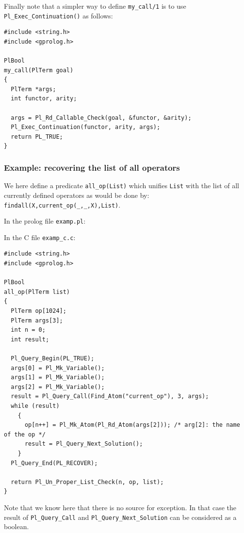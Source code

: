 Finally note that a simpler way to define \texttt{my\_call/1} is to use
\texttt{Pl\_Exec\_Continuation()} as follows:

\begin{Code}
\begin{verbatim}
#include <string.h>
#include <gprolog.h>

PlBool
my_call(PlTerm goal)
{
  PlTerm *args;
  int functor, arity;

  args = Pl_Rd_Callable_Check(goal, &functor, &arity);
  Pl_Exec_Continuation(functor, arity, args);
  return PL_TRUE;
}
\end{verbatim}
\end{Code}

\subsubsection{Example: recovering the list of all operators}

We here define a predicate \texttt{all\_op(List)} which unifies
\texttt{List} with the list of all currently defined operators as would be done by: \texttt{findall(X,current\_op(\_,\_,X),List)}.

In the prolog file \texttt{examp.pl}:


In the C file \texttt{examp\_c.c}:

\begin{Code}
\begin{verbatim}
#include <string.h>
#include <gprolog.h>

PlBool
all_op(PlTerm list)
{
  PlTerm op[1024];
  PlTerm args[3];
  int n = 0;
  int result;

  Pl_Query_Begin(PL_TRUE);
  args[0] = Pl_Mk_Variable();
  args[1] = Pl_Mk_Variable();
  args[2] = Pl_Mk_Variable();
  result = Pl_Query_Call(Find_Atom("current_op"), 3, args);
  while (result)
    {
      op[n++] = Pl_Mk_Atom(Pl_Rd_Atom(args[2])); /* arg[2]: the name of the op */
      result = Pl_Query_Next_Solution();
    }
  Pl_Query_End(PL_RECOVER);

  return Pl_Un_Proper_List_Check(n, op, list);
}
\end{verbatim}
\end{Code}

Note that we know here that there is no source for exception. In that case
the result of \texttt{Pl\_Query\_Call} and \texttt{Pl\_Query\_Next\_Solution}
can be considered as a boolean.

